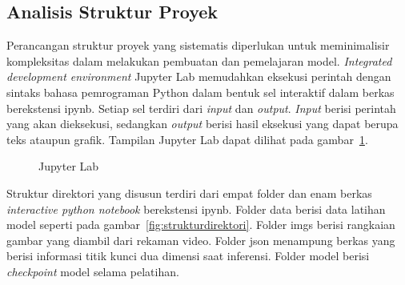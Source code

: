 \subsection{Analisis Struktur Proyek}

Perancangan struktur proyek yang sistematis diperlukan untuk meminimalisir kompleksitas dalam
melakukan pembuatan dan pemelajaran model. \textit{Integrated development environment} Jupyter Lab
memudahkan eksekusi perintah dengan sintaks bahasa pemrograman Python dalam bentuk sel interaktif
dalam berkas berekstensi ipynb. Setiap sel terdiri dari
\textit{input} dan \textit{output}. \textit{Input} berisi perintah yang akan dieksekusi, sedangkan
\textit{output} berisi hasil eksekusi yang dapat berupa teks ataupun grafik. Tampilan Jupyter Lab
dapat dilihat pada gambar~\ref{fig:jupyterlab}.

\begin{figure}[htbp]
    \begin{center}
    \end{center}
    \vspace{-20pt}
    \captionsetup{labelfont=bf, textfont=bf}
    \caption{Jupyter Lab}
    \vspace{-10pt}
    \captionsetup{labelfont=md, textfont=md}
    \label{fig:jupyterlab}
\end{figure}


Struktur direktori yang disusun terdiri dari empat folder dan enam berkas \textit{interactive python notebook}
berekstensi ipynb. Folder data berisi data latihan model seperti pada gambar~\ref{fig:strukturdirektori}.
Folder imgs berisi rangkaian gambar yang
diambil dari rekaman video. Folder json menampung berkas yang berisi informasi titik kunci dua dimensi saat
inferensi. Folder model berisi \textit{checkpoint} model selama pelatihan.

